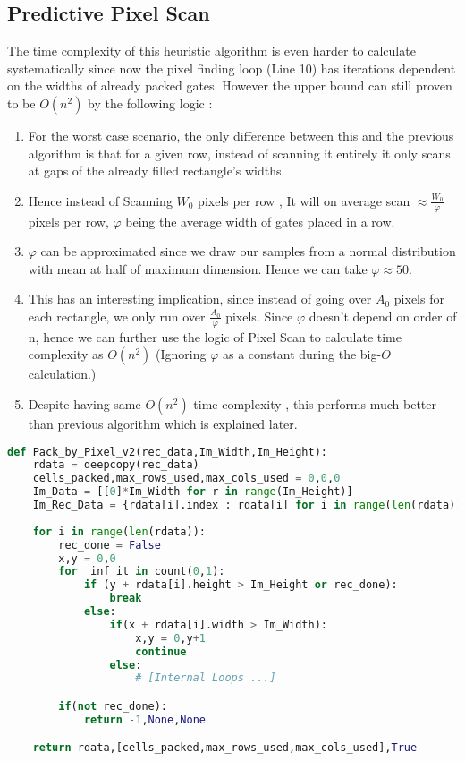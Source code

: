 \documentclass[12pt, a4paper,openany]{article}
\begin{document}
\newpage
\subsection{Predictive Pixel Scan}
\begin{flushleft}
    The time complexity of this heuristic algorithm is even harder to calculate systematically since now the pixel finding loop (Line 10) has iterations dependent on the widths of already packed gates. However the upper bound can still proven to be \(O(n^{2})\) by the following logic :
    \begin{enumerate}
    \item For the worst case scenario, the only difference between this and the previous algorithm is that for a given row, instead of scanning it entirely it only scans at gaps of the already filled rectangle's widths.
    \item Hence instead of Scanning \(W_{0}\) pixels per row , It will on average scan \(\approx \frac{W_{0}}{\varphi}\) pixels per row, \(\varphi\) being the average width of gates placed in a row.
    \item \(\varphi\) can be approximated since we draw our samples from a normal distribution with mean at half of maximum dimension. Hence we can take \(\varphi \approx 50\).
    \item This has an interesting implication, since instead of going over \(A_{0}\) pixels for each rectangle, we only run over \(\frac{A_{0}}{\varphi}\) pixels. Since \(\varphi\) doesn't depend on order of n, hence we can further use the logic of Pixel Scan to calculate time complexity as \(O(n^{2})\) (Ignoring \(\varphi\) as a constant during the big-\(O\) calculation.)
    \item Despite having same \(O(n^{2})\) time complexity , this performs much better than previous algorithm which is explained later.
\end{enumerate}
\end{flushleft}
\begin{lstlisting}[language=Python, caption= Outer loops of Predictive Pixel Scan Implementation]
def Pack_by_Pixel_v2(rec_data,Im_Width,Im_Height):
    rdata = deepcopy(rec_data)
    cells_packed,max_rows_used,max_cols_used = 0,0,0
    Im_Data = [[0]*Im_Width for r in range(Im_Height)]
    Im_Rec_Data = {rdata[i].index : rdata[i] for i in range(len(rdata))}
        
    for i in range(len(rdata)):
        rec_done = False
        x,y = 0,0
        for _inf_it in count(0,1):
            if (y + rdata[i].height > Im_Height or rec_done):
                break
            else:
                if(x + rdata[i].width > Im_Width):
                    x,y = 0,y+1
                    continue
                else:
                    # [Internal Loops ...]

        if(not rec_done):
            return -1,None,None                    

    return rdata,[cells_packed,max_rows_used,max_cols_used],True

\end{lstlisting}
\end{document}
